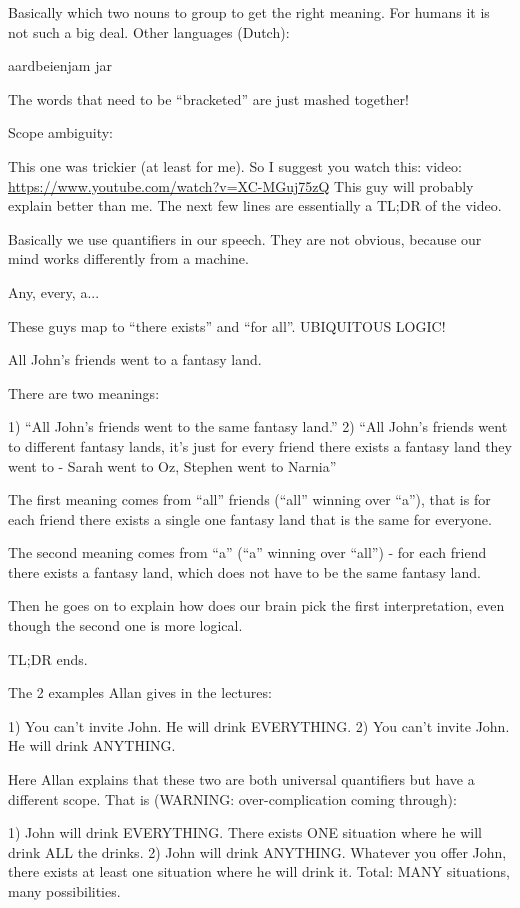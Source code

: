 Basically which two nouns to group to get the right meaning. For humans it is
not such a big deal. Other languages (Dutch):

aardbeienjam jar

The words that need to be ``bracketed'' are just mashed together!

Scope ambiguity:

This one was trickier (at least for me). So I suggest you watch this: video:
\url{https://www.youtube.com/watch?v=XC-MGuj75zQ} This guy will probably explain
better than me. The next few lines are essentially a TL;DR of the video.

Basically we use quantifiers in our speech. They are not obvious, because our
mind works differently from a machine.

Any, every, a...

These guys map to ``there exists'' and ``for all''. UBIQUITOUS LOGIC!

All John's friends went to a fantasy land.

There are two meanings:

1) ``All John's friends went to the same fantasy land.''
2) ``All John's friends went to different fantasy lands, it's just for every friend there exists a fantasy land they went to - Sarah went to Oz, Stephen went to Narnia''

The first meaning comes from ``all'' friends (``all'' winning over ``a''), that
is for each friend there exists a single one fantasy land that is the same for
everyone.

The second meaning comes from ``a'' (``a'' winning over ``all'') - for each
friend there exists a fantasy land, which does not have to be the same fantasy
land.

Then he goes on to explain how does our brain pick the first interpretation,
even though the second one is more logical.

TL;DR ends.

The 2 examples Allan gives in the lectures:

1) You can't invite John. He will drink EVERYTHING.
2) You can't invite John. He will drink ANYTHING.

Here Allan explains that these two are both universal quantifiers but have a
different scope. That is (WARNING: over-complication coming through):

1) John will drink EVERYTHING.
There exists ONE situation where he will drink ALL the drinks.
2) John will drink ANYTHING.
Whatever you offer John, there exists at least one situation where he will drink
it. Total: MANY situations, many possibilities.

